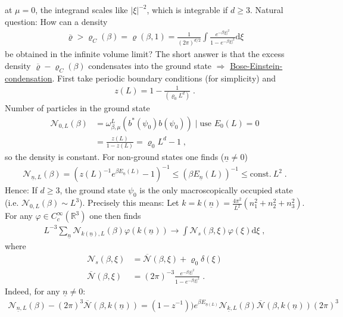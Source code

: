 \documentclass[
a4paper, %
11pt, %
onecolumn, %
openany, %
]{memoir}
\theoremstyle{definition}
\theoremstyle{remark}
\theoremstyle{plain}
\begin{document}
at $\mu=0$, the integrand scales like $|\xi|^{-2}$, which is integrable if $d\geq 3$. Natural question: How can a density 
\begin{align}
\overline{\varrho}>\varrho_C(\beta)=\varrho(\beta,1)=\frac{1}{(2\pi)^{d/2}}\int \frac{e^{- \beta |\xi|^2}}{1-e^{-\beta |\xi|^2}}\mathrm{d}\xi
\end{align} be obtained in the infinite volume limit? The short answer is that the excess density $\overline{\varrho}-\varrho_C(\beta)$ condensates into the ground state $\Rightarrow$ \underline{Bose-Einstein-condensation}.
First take periodic boundary conditions (for simplicity) and \begin{align}
z(L)=1-\frac{1}{(\varrho_0L^d)}\; .
\end{align}
Number of particles in the ground state \begin{align}
\mathcal{N}_{0,L}(\beta)&=\omega_{\beta,\mu}^L(b^*(\psi_0)b(\psi_0))\mid \text{use }E_0(L)=0\\&=\frac{z(L)}{1-z(L)}=\varrho_0 L^d-1\; ,\label{eqn::relation_nz}
\end{align}
so the density is constant. For non-ground states one finds ($\underline{n}\neq 0$) \begin{align}
\mathcal{N}_{\underline{n},L}(\beta)=(z(L)^{-1}e^{\beta E_{\underline{n}}(L)}-1)^{-1}\leq (\beta E_{\underline{n}}(L))^{-1}\leq \mathrm{const. }~L^2\; .
\end{align}
Hence: If $d\geq 3$, the ground state $\psi_0$ is the only macroscopically occupied state (i.e. $\mathcal{N}_{0,L}(\beta)\sim L^3$). Precisely this means: Let $k=k(\underline{n})=\frac{4\pi^2}{L^2}(n_1^2+n_2^2+n_3^2)$. For any $\varphi\in C_c^{\infty}(\mathbb{R}^3)$ one then finds \begin{align}
L^{-3}\sum_{\underline{n}}\mathcal{N}_{k(\underline{n}),L}(\beta)\varphi(k(\underline{n}))\rightarrow \int \mathcal{N}_s(\beta,\xi)\varphi(\xi)\mathrm{d}\xi\; ,
\end{align}
where  \begin{align}\mathcal{N}_s(\beta,\xi)&=\overline{\mathcal{N}}(\beta,\xi)+\varrho_0 \delta(\xi) \\
\overline{\mathcal{N}}(\beta,\xi)&=(2\pi)^{-3}\frac{e^{-\beta|\xi|^2}}{1-e^{-\beta|\xi|^2}}\; .
\end{align}
Indeed, for any $\underline{n}\neq 0$: \begin{align}
\mathcal{N}_{\underline{n},L}(\beta)-(2\pi)^3\overline{\mathcal{N}}(\beta, k(\underline{n}))=(1-z^{-1}))e^{\beta E_{\underline{n}(L)}}\mathcal{N}_{\underline{k},L}(\beta)\overline{\mathcal{N}}(\beta,k(\underline{n}))(2\pi)^3
\end{align}
\end{document}
